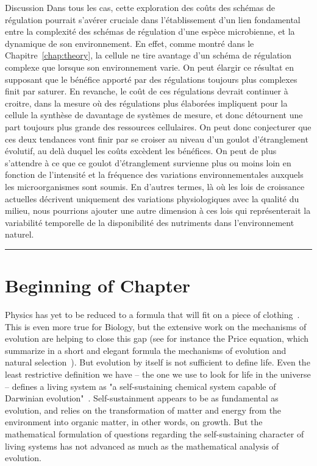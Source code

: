 \begin{chapter_summary}{Discussion}
Dans tous les cas, cette exploration des coûts des schémas de régulation pourrait s'avérer cruciale dans l'établissement d'un lien fondamental entre la complexité des schémas de régulation d'une espèce microbienne, et la dynamique de son environnement.
En effet, comme montré dans le Chapitre~\ref{chap:theory}, la cellule ne tire avantage d'un schéma de régulation complexe que lorsque son environnement varie.
On peut élargir ce résultat en supposant que le bénéfice apporté par des régulations toujours plus complexes finit par saturer.
En revanche, le coût de ces régulations devrait continuer à croitre, dans la mesure où des régulations plus élaborées impliquent pour la cellule la synthèse de davantage de systèmes de mesure, et donc détournent une part toujours plus grande des ressources cellulaires.
On peut donc conjecturer que ces deux tendances vont finir par se croiser au niveau d'un goulot d'étranglement évolutif, au delà duquel les coûts excèdent les bénéfices.
On peut de plus s'attendre à ce que ce goulot d'étranglement survienne plus ou moins loin en fonction de l'intensité et la fréquence des variations environnementales auxquels les microorganismes sont soumis.
En d'autres termes, là où les lois de croissance actuelles décrivent uniquement des variations physiologiques avec la qualité du milieu, nous pourrions ajouter une autre dimension à ces lois qui représenterait la variabilité temporelle de la disponibilité des nutriments dans l'environnement naturel.
\end{chapter_summary}

\begin{center}
\noindent\rule{4cm}{0.1pt}
\end{center}

\section*{Beginning of Chapter \thechapter}

Physics has yet to be reduced to a formula that will fit on a piece of clothing~\cite{falk_universe_2005}.
This is even more true for Biology, but the extensive work on the mechanisms of evolution are helping to close this gap (see for instance the Price equation, which summarize in a short and elegant formula the mechanisms of evolution and natural selection~\cite{frank_natural_2012}).
But evolution by itself is not sufficient to define life.
Even the least restrictive definition we have -- the one we use to look for life in the universe -- defines a living system as "a self-sustaining chemical system capable of Darwinian evolution"~\cite{deamer_origins_1994,benner_defining_2010}.
Self-sustainment appears to be as fundamental as evolution, and relies on the transformation of matter and energy from the environment into organic matter, in other words, on growth.
But the mathematical formulation of questions regarding the self-sustaining character of living systems has not advanced as much as the mathematical analysis of evolution.

